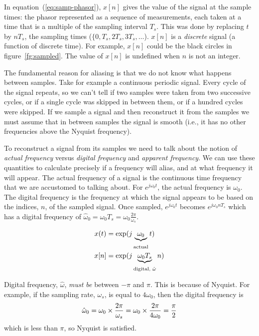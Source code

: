 In equation~(\ref{eq:samp-phasor}), $x[n]$ gives the value of the signal at the
sample times: the phasor represented as a sequence of measurements,
each taken at a time that is a multiple of the sampling interval
$T_s$. This was done by replacing $t$ by $nT_s$, the sampling times
($\{0, T_s, 2T_s, 3T_s, \ldots$). $x[n]$ is a \emph{discrete} signal
(a function of discrete time). For example, $x[n]$ could be the black circles in
figure~\ref{fg:sampled}. The value of $x[n]$ is undefined when $n$ is not an integer. 

The fundamental reason for aliasing is that we do not know what happens between samples. Take for example a continuous periodic signal. Every cycle of the signal repeats, so we can't tell if two
samples were taken from two successive cycles, or if a single cycle
was skipped in between them, or if a hundred cycles were
skipped. If we sample a signal and then reconstruct it from the samples we must assume that in between samples the signal is smooth (i.e., it has no other frequencies above the Nyquist frequency). 

To reconstruct a signal from its samples we need to talk about the notion of \emph{actual frequency} versus \emph{digital frequency} and \emph{apparent frequency}. We can use these quantities to calculate precisely if a frequency will alias, and at what frequency it will appear. The actual frequency of a signal is the continuous time frequency that we are accustomed to talking about. For  $e^{j\omega_0 t}$, the actual frequency is $\omega_0$. The digital frequency is the frequency at which the signal appears to be based on the indices, $n$, of the sampled signal. Once sampled, $ e^{j\omega_0 t}$ becomes $ e^{j\omega_0 nT_s}$ which has a digital frequency of $\hat{\omega}_0=\omega_0 T_s=\omega_0 \frac{2\pi}{\omega_s}$.  

\begin{align}
x(t) & = \exp(j\underbrace{\omega_0}_{\stackrel{}{\text{actual}}}t) \notag\\
x[n] & = \exp(j\underbrace{\omega_0 T_s}_{\stackrel{}{\text{digital, $\hat{\omega}$}}} n) \label{eq:samp-phasor-nyq}
\end{align}

Digital frequency, $\hat{\omega}$, \emph{must be} between $-\pi$ and $\pi$. This is because of Nyquist. For example, if the sampling rate, $\omega_s$, is equal to $4\omega_0$, then the digital frequency is
 \[
 \hat{\omega}_0=\omega_0 \times  \frac{2\pi}{\omega_s}=\omega_0\times \frac{2\pi}{4\omega_0}=\frac{\pi}{2} \notag 
 \]
which is less than $\pi$, so Nyquist is satisfied.

